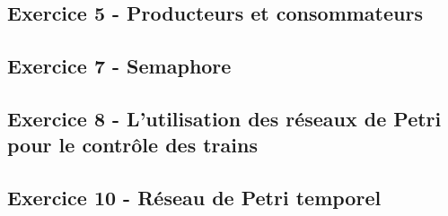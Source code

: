 \documentclass[a4paper,11pt]{article}
\begin{document}
\subsection{Exercice 5 - Producteurs et consommateurs}





\subsection{Exercice 7 - Semaphore}



\subsection{Exercice 8 - L'utilisation des réseaux de Petri pour le contrôle des trains}



\subsection{Exercice 10 - Réseau de Petri temporel}


\end{document}
